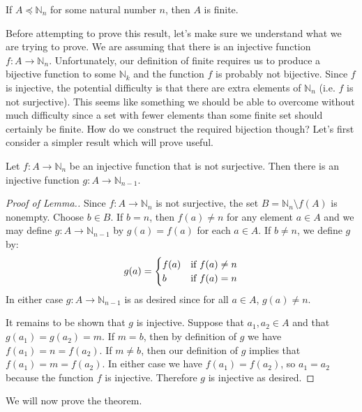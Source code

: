 \begin{thrm}\label{thrm:finite}
If $A\preceq \mathbb N_n$ for some natural number $n$, then $A$ is finite.
\end{thrm}

Before attempting to prove this result, let's make sure we understand what we are trying to prove.  We are assuming that there is an injective function $f:A\to \mathbb N_n$.  Unfortunately, our definition of finite requires us to produce a bijective function to some $\mathbb N_k$ and the function $f$ is probably not bijective.  Since $f$ is injective, the potential difficulty is that there are extra elements of $\mathbb N_n$ (i.e. $f$ is not surjective).  This seems like something we should be able to overcome without much difficulty since a set with fewer elements than some finite set should certainly be finite.  How do we construct the required bijection though?  Let's first consider a simpler result which will prove useful.

\begin{lemma}\label{lemma:step}
Let $f:A\to\mathbb N_n$ be an injective function that is not surjective. Then there is an injective function $g:A\to\mathbb N_{n-1}$.
\end{lemma}

\begin{proof}[Proof of Lemma.]
Since $f:A\to \mathbb N_n$ is not surjective, the set $B=\mathbb N_n \setminus f(A)$ is nonempty.  Choose $b\in B$.  If $b=n$, then $f(a)\neq n$ for any element $a\in A$ and we may define $g:A\to \mathbb N_{n-1}$ by $g(a)=f(a)$ for each $a\in A$.  If $b\neq n$, we define $g$ by: \[ g(a)= \begin{cases} f(a) & \mbox{if } f(a)\neq n\cr b & \mbox{if } f(a)=n\cr\end{cases} \] In either case $g:A\to\mathbb N_{n-1}$ is as desired since for all $a\in A$, $g(a)\neq n$.

It remains to be shown that $g$ is injective.  Suppose that $a_1,a_2\in A$ and that $g(a_1)=g(a_2)=m$.  If $m=b$, then by definition of $g$ we have $f(a_1)=n=f(a_2)$. If $m\neq b$, then our definition of $g$ implies that $f(a_1)=m=f(a_2)$.  In either case we have $f(a_1)=f(a_2)$, so $a_1=a_2$ because the function $f$ is injective.  Therefore $g$ is injective as desired.
\end{proof}

We will now prove the theorem.

